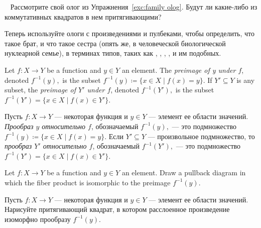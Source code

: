 \documentclass[../main/CT4S-EN-RU]{subfiles}
\begin{document}
\begin{exerciseRUS}~
\sexc Рассмотрите свой олог из Упражнения~\ref{exc:family olog}. Будут ли какие-либо из коммутативных квадратов в нем притягивающими? 
\item Теперь используйте ологи с произведениями и пулбеками, чтобы определить, что такое брат, и что такое сестра (опять же, в человеческой биологической нуклеарной семье), в терминах типов, таких как , , , , и им подобных.
\endsexc
\end{exerciseRUS}

\begin{definitionENG}[Preimage]\label{def:preimage}
Let $f\colon X{→} Y$ be a function and $y\in Y$ an element. The {\em preimage of y under $f$}, denoted $f^{-1}(y),$ is  the subset $f^{-1}(y){\coloneqq}\{x\in X{\;|\;}f(x)=y\}.$ If $Y'\subseteq Y$ is any subset, the {\em preimage of $Y'$ under $f$}, denoted $f^{-1}(Y'),$ is the subset $f^{-1}(Y')=\{x\in X{\;|\;}f(x)\in Y'\}.$
\end{definitionENG}

\begin{definitionRUS}[Прообраз]\label{def:preimage}
Пусть $f\colon X{→} Y$ — некоторая функция и $y\in Y$ — элемент ее области значений. {\em Прообраз $y$ относительно $f$}, обозначаемый $f^{-1}(y),$ — это подмножество $f^{-1}(y){\coloneqq}\{x\in X{\;|\;}f(x)=y\}.$ Если $Y'\subseteq Y$ — произвольное подмножество, то {\em прообраз $Y'$ относительно $f$}, обозначаемый $f^{-1}(Y'),$ — это подмножество $f^{-1}(Y')=\{x\in X{\;|\;}f(x)\in Y'\}.$
\end{definitionRUS}

\begin{exerciseENG}
Let $f\colon X{→} Y$ be a function and $y\in Y$ an element. Draw a pullback diagram in which the fiber product is isomorphic to the preimage $f^{-1}(y).$
\end{exerciseENG}

\begin{exerciseRUS}
Пусть $f\colon X{→} Y$ — некоторая функция и $y\in Y$ — элемент ее области значений. Нарисуйте притягивающий квадрат, в котором расслоенное произведение изоморфно прообразу $f^{-1}(y).$ 
\end{exerciseRUS}
\end{document}
